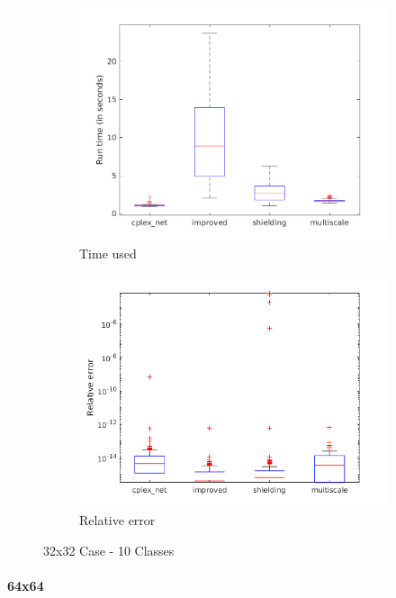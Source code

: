 \documentclass[]{article}
\let\oldparagraph\paragraph
\renewcommand{\paragraph}[1]{\oldparagraph{#1}\mbox{}}
\begin{document}
\begin{figure}[htpb]
	\centering
	\begin{subfigure}{0.49 \textwidth}
		\centering
		\includegraphics[width = \textwidth]{../pic-tests/plot/time_32x_10x5.png}
		\caption{Time used}
	\end{subfigure}
	\begin{subfigure}{0.49 \textwidth}
		\centering
		\includegraphics[width = \textwidth]{../pic-tests/plot/error_32x_10x5.png}
		\caption{Relative error}
	\end{subfigure}
	\caption{32x32 Case - 10 Classes}
\end{figure}

\paragraph{64x64}
\end{document}
